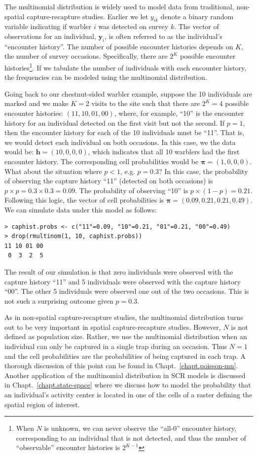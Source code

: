 The multinomial distribution is widely used to model data from traditional,
non-spatial capture-recapture studies.
Earlier we let $y_{ik}$ denote a binary random variable indicating if
warbler $i$ was detected on survey $k$. The vector of observations for an
individual, $\mathbf{y}_i$, is often referred to as the individual's
``encounter history''. The number of possible encounter
histories depends on $K$, the number of survey occasions. Specifically,
there are $2^K$
possible encounter histories\footnote{When $N$ is unknown, we can
  never observe the ``all-0'' encounter history, corresponding
to an individual that is not
  detected, and thus the number of ``observable'' encounter histories
  is $2^{K-1}$}.
If we tabulate the number of individuals with each encounter history,
the frequencies can be modeled using the multinomial
distribution.

Going back to our chestnut-sided warbler example, suppose the 10
individuals are marked and we make $K=2$ visits to the site such that
there are $2^K = 4$ possible encounter histories: $(11, 10, 01, 00)$,
where, for example,  ``10'' is the encounter history for an individual
detected on the first visit but not the second. If $p=1$, then the
encounter history for each of the 10 individuals must  be ``11''. That
is, we would detect each individual on both occasions. In this case,
we the data would be: $\mathbf{h} = (10, 0, 0, 0)$, which indicates
that all 10 warblers had the first encounter history. The
corresponding cell probabilities would be $\bm{\pi} = (1, 0, 0,
0)$. What about the situation where $p<1$, e.g. $p=0.3$? In this case, the
probability of observing the capture history ``11'' (detected on both
occasions) is $p \times p = 0.3 \times 0.3 = 0.09$. The probability of
observing ``10'' is $p \times (1-p) = 0.21$. Following this logic, the vector
of cell probabilities is $\bm{\pi} = (0.09, 0.21, 0.21, 0.49)$. We can
simulate data under this model as follows:
\begin{verbatim}
> caphist.probs <- c("11"=0.09, "10"=0.21, "01"=0.21, "00"=0.49)
> drop(rmultinom(1, 10, caphist.probs))
11 10 01 00
 0  3  2  5
\end{verbatim}
The
result of our simulation is that zero individuals were observed with
the capture history ``11'' and 5 individuals were observed with the
capture history ``00''. The other 5 individuals were observed one out
of the two occasions. This is not such a surprising outcome given
$p=0.3$.

As in non-spatial capture-recapture studies, the multinomial
distribution turns out to be very important in spatial
capture-recapture studies. However, $N$ is not defined as population
size. Rather, we use the multinomial distribution when an individual
can only be captured in a single trap during an occasion. Thus
$N=1$ and the cell probabilities are the probabilities of
being captured in each trap. A thorough discussion of this point can
be found in Chapt.~\ref{chapt.poisson-mn}. Another application of the
multinomial distribution in SCR models is discussed in
Chapt.~\ref{chapt.state-space} where we discuss how to model the
probability that an individual's activity center is located in one of
the cells of a raster defining the spatial region of interest.

